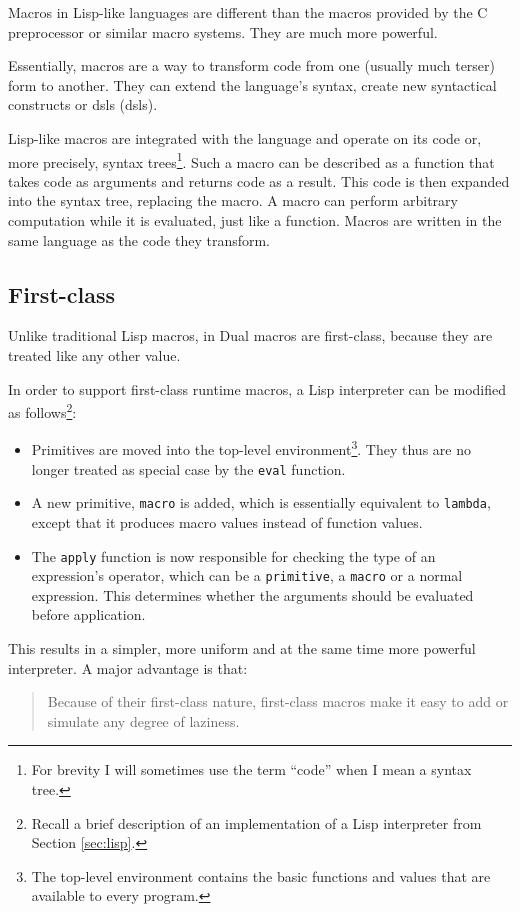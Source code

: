 Macros in Lisp-like languages are different than the macros provided by the C preprocessor or similar macro systems. They are much more powerful\cite{c2_macros}.

Essentially, macros are a way to transform code from one (usually much terser) form to another. They can extend the language's syntax, create new syntactical constructs or \acrlong{dsl}s (\acrshort{dsl}s)\cite[Chapter~3]{lol_book}.

Lisp-like macros are integrated with the language and operate on its code or, more precisely, syntax trees\footnote{For brevity I will sometimes use the term ``code'' when I mean a syntax tree.}. Such a macro can be described as a function that takes code as arguments and returns code as a result. This code is then expanded into the syntax tree, replacing the macro. A macro can perform arbitrary computation while it is evaluated, just like a function. Macros are written in the same language as the code they transform.

\subsection{First-class}
Unlike traditional Lisp macros, in Dual macros are first-class, because they are treated like any other value.

In order to support first-class runtime macros, a Lisp interpreter can be
modified as follows\cite{macros}\footnote{Recall a brief description of an implementation of a Lisp interpreter from Section \ref{sec:lisp}.}:
\begin{itemize}
    \item Primitives are moved into the top-level environment\footnote{The top-level environment contains the basic functions and values that are available to every program.}. They thus are no longer treated as special case by the \texttt{eval} function.
    \item A new primitive, \texttt{macro} is added, which is essentially
    equivalent to \texttt{lambda}, except that it produces macro values
    instead of function values.
    \item The \texttt{apply} function is now responsible for checking the
    type of an expression's operator, which can be a \texttt{primitive}, a
    \texttt{macro} or a normal expression. This determines whether the
    arguments should be evaluated before application.
\end{itemize}

This results in a simpler, more uniform and at the same time more powerful
interpreter. A major advantage is that:
\begin{quote}
Because of their first-class nature, first-class macros make it easy to add or
simulate any degree of laziness\cite{macros}.
\end{quote}

